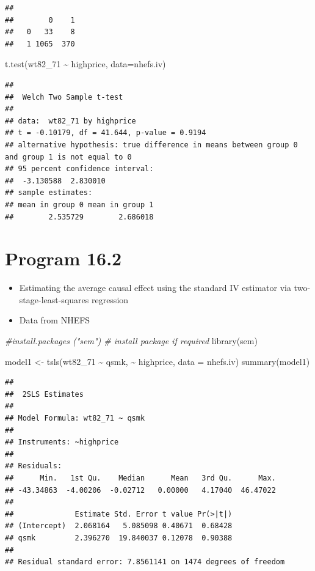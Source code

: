 \documentclass[
  10pt,
]{book}
\newenvironment{Shaded}{\begin{snugshade}}{\end{snugshade}}
\newcommand{\AttributeTok}[1]{\textcolor[rgb]{0.77,0.63,0.00}{#1}}
\newcommand{\CommentTok}[1]{\textcolor[rgb]{0.56,0.35,0.01}{\textit{#1}}}
\newcommand{\FunctionTok}[1]{\textcolor[rgb]{0.00,0.00,0.00}{#1}}
\newcommand{\NormalTok}[1]{#1}
\newcommand{\OtherTok}[1]{\textcolor[rgb]{0.56,0.35,0.01}{#1}}
\newcommand{\SpecialCharTok}[1]{\textcolor[rgb]{0.00,0.00,0.00}{#1}}
\providecommand{\tightlist}{%
  \setlength{\itemsep}{0pt}\setlength{\parskip}{0pt}}
\begin{document}
\begin{verbatim}
##    
##        0    1
##   0   33    8
##   1 1065  370
\end{verbatim}

\begin{Shaded}
\begin{Highlighting}[]
\FunctionTok{t.test}\NormalTok{(wt82\_71 }\SpecialCharTok{\textasciitilde{}}\NormalTok{ highprice, }\AttributeTok{data=}\NormalTok{nhefs.iv)}
\end{Highlighting}
\end{Shaded}

\begin{verbatim}
## 
##  Welch Two Sample t-test
## 
## data:  wt82_71 by highprice
## t = -0.10179, df = 41.644, p-value = 0.9194
## alternative hypothesis: true difference in means between group 0 and group 1 is not equal to 0
## 95 percent confidence interval:
##  -3.130588  2.830010
## sample estimates:
## mean in group 0 mean in group 1 
##        2.535729        2.686018
\end{verbatim}

\hypertarget{program-16.2}{%
\section{Program 16.2}\label{program-16.2}}

\begin{itemize}
\tightlist
\item
  Estimating the average causal effect using the standard IV estimator via two-stage-least-squares regression
\item
  Data from NHEFS
\end{itemize}

\begin{Shaded}
\begin{Highlighting}[]
\CommentTok{\#install.packages ("sem") \# install package if required}
\FunctionTok{library}\NormalTok{(sem) }

\NormalTok{model1 }\OtherTok{\textless{}{-}} \FunctionTok{tsls}\NormalTok{(wt82\_71 }\SpecialCharTok{\textasciitilde{}}\NormalTok{ qsmk, }\SpecialCharTok{\textasciitilde{}}\NormalTok{ highprice, }\AttributeTok{data =}\NormalTok{ nhefs.iv)}
\FunctionTok{summary}\NormalTok{(model1)}
\end{Highlighting}
\end{Shaded}

\begin{verbatim}
## 
##  2SLS Estimates
## 
## Model Formula: wt82_71 ~ qsmk
## 
## Instruments: ~highprice
## 
## Residuals:
##      Min.   1st Qu.    Median      Mean   3rd Qu.      Max. 
## -43.34863  -4.00206  -0.02712   0.00000   4.17040  46.47022 
## 
##              Estimate Std. Error t value Pr(>|t|)
## (Intercept)  2.068164   5.085098 0.40671  0.68428
## qsmk         2.396270  19.840037 0.12078  0.90388
## 
## Residual standard error: 7.8561141 on 1474 degrees of freedom
\end{verbatim}
\end{document}
